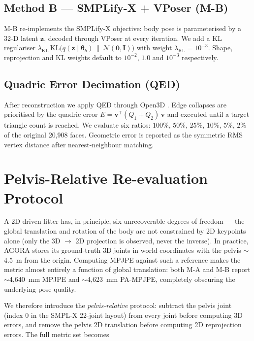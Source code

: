 \documentclass[conference]{IEEEtran}
\begin{document}
\subsection{Method B --- SMPLify-X + VPoser (\textsc{M-B})}
\textsc{M-B} re-implements the SMPLify-X \cite{SMPLifyX} objective: body pose is parameterised by a 32-D latent $\mathbf{z}$, decoded through VPoser \cite{VPoser} at every iteration. We add a KL regulariser $\lambda_{\text{KL}}\,\mathrm{KL}\!\big(q(\mathbf{z}\mid\boldsymbol{\theta}_b)\,\|\,\mathcal{N}(\mathbf{0},\mathbf{I})\big)$ with weight $\lambda_{\text{KL}} = 10^{-3}$. Shape, reprojection and KL weights default to $10^{-2}$, $1.0$ and $10^{-3}$ respectively.

\subsection{Quadric Error Decimation (QED)}
After reconstruction we apply QED \cite{QED} through Open3D \cite{Open3D}. Edge collapses are prioritised by the quadric error $E = \mathbf{v}^{\!\top}(Q_1 + Q_2)\,\mathbf{v}$ and executed until a target triangle count is reached. We evaluate six ratios: $100\%,\,50\%,\,25\%,\,10\%,\,5\%,\,2\%$ of the original 20,908 faces. Geometric error is reported as the symmetric RMS vertex distance after nearest-neighbour matching.

\section{Pelvis-Relative Re-evaluation Protocol}
\label{sec:protocol}

A 2D-driven fitter has, in principle, six unrecoverable degrees of freedom --- the global translation and rotation of the body are not constrained by 2D keypoints alone (only the 3D $\rightarrow$ 2D projection is observed, never the inverse). In practice, AGORA stores its ground-truth 3D joints in world coordinates with the pelvis $\sim$4.5~m from the origin. Computing MPJPE against such a reference makes the metric almost entirely a function of global translation: both \textsc{M-A} and \textsc{M-B} report $\sim$4,640~mm MPJPE and $\sim$4,623~mm PA-MPJPE, completely obscuring the underlying pose quality.

We therefore introduce the \emph{pelvis-relative} protocol: subtract the pelvis joint (index $0$ in the SMPL-X 22-joint layout) from every joint before computing 3D errors, and remove the pelvis 2D translation before computing 2D reprojection errors. The full metric set becomes
\end{document}
